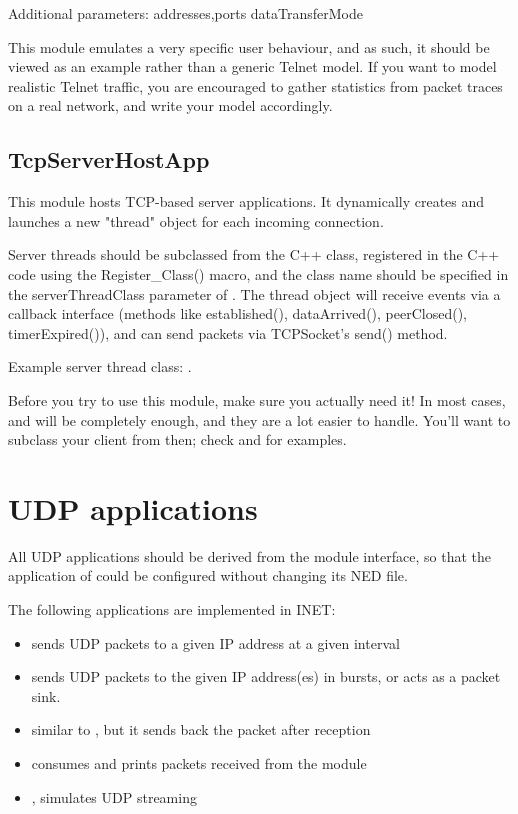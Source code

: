 Additional parameters:
addresses,ports
dataTransferMode

\begin{note}
This module emulates a very specific user behaviour, and as such,
it should be viewed as an example rather than a generic Telnet model.
If you want to model realistic Telnet traffic, you are encouraged
to gather statistics from packet traces on a real network, and
write your model accordingly.
\end{note}

\subsection{TcpServerHostApp}

This module hosts TCP-based server applications. It dynamically creates
and launches a new "thread" object for each incoming connection.

Server threads should be subclassed from the 
C++ class, registered in the C++ code using the Register\_Class() macro,
and the class name should be specified in the serverThreadClass
parameter of . The thread object will receive events
via a callback interface (methods like established(), dataArrived(),
peerClosed(), timerExpired()), and can send packets via TCPSocket's send()
method.

Example server thread class: .

\begin{important}
Before you try to use this module, make sure you actually need it!
In most cases,  and  will be completely
enough, and they are a lot easier to handle. You'll want to subclass your
client from  then; check  and
 for examples.
\end{important}


\section{UDP applications}

All UDP applications should be derived from the  module interface,
so that the application of  could be configured without changing its NED file.

The following applications are implemented in INET:
\begin{itemize}
\item {} sends UDP packets to a given IP address at a given interval
\item {} sends UDP packets to the given IP address(es) in bursts, or acts as a packet sink.
\item {} similar to , but it sends back the packet after reception
\item {} consumes and prints packets received from the  module
\item {}, simulates UDP streaming
\end{itemize}

